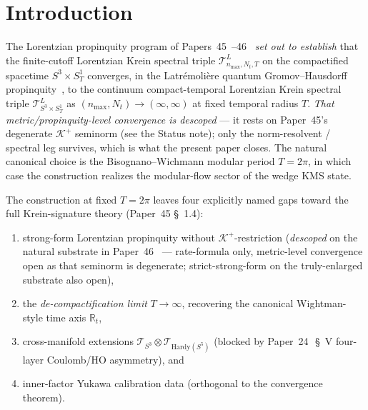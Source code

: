 \documentclass[11pt,a4paper]{article}
\theoremstyle{plain}
\theoremstyle{definition}
\newcommand{\nmax}{n_{\max}}
\newcommand{\Nt}{N_{t}}
\newcommand{\sthree}{S^{3}}
\newcommand{\Manifold}{S^{3}\times S^{1}_{T}}
\newcommand{\Krein}{\mathcal{K}}
\newcommand{\Tcal}{\mathcal{T}}
\newcommand{\R}{\mathbb{R}}
\newcommand{\Kplus}{\Krein^{+}}
\begin{document}
\section{Introduction}\label{sec:intro}

The Lorentzian propinquity program of
Papers~45~\cite{paper45}--46~\cite{paper46} \emph{set out to establish}
that the finite-cutoff Lorentzian Krein spectral triple
$\Tcal^{L}_{\nmax, \Nt, T}$ on the compactified spacetime
$\Manifold$ converges, in the Latr\'emoli\`ere quantum
Gromov--Hausdorff propinquity~\cite{latremoliere_metric_st_2017,
latremoliere2018}, to the continuum compact-temporal Lorentzian Krein
spectral triple $\Tcal^{L}_{\Manifold}$ as $(\nmax, \Nt)\to(\infty,\infty)$
at fixed temporal radius $T$. \emph{That metric/propinquity-level
convergence is descoped} --- it rests on Paper~45's degenerate $\Kplus$
seminorm (see the Status note); only the norm-resolvent / spectral leg
survives, which is what the present paper closes. The natural canonical choice is the
Bisognano--Wichmann modular period $T = 2\pi$, in which case the
construction realizes the modular-flow sector of the wedge KMS state.

The construction at fixed $T = 2\pi$ leaves four explicitly named gaps
toward the full Krein-signature theory (Paper~45 \S~1.4):
\begin{enumerate}
\item[(G1)] strong-form Lorentzian propinquity without
$\Kplus$-restriction (\emph{descoped} on the natural substrate in
Paper~46~\cite{paper46} --- rate-formula only, metric-level convergence
open as that seminorm is degenerate; strict-strong-form on the
truly-enlarged substrate also open),
\item[(G2)] the \emph{de-compactification limit} $T \to \infty$,
recovering the canonical Wightman-style time axis $\R_{t}$,
\item[(G3)] cross-manifold extensions
$\Tcal_{\sthree}\otimes\Tcal_{\mathrm{Hardy}(S^{5})}$
(blocked by Paper~24~\cite{paper24}\,\S~V four-layer Coulomb/HO
asymmetry), and
\item[(G4)] inner-factor Yukawa calibration data (orthogonal to the
convergence theorem).
\end{enumerate}
\end{document}
